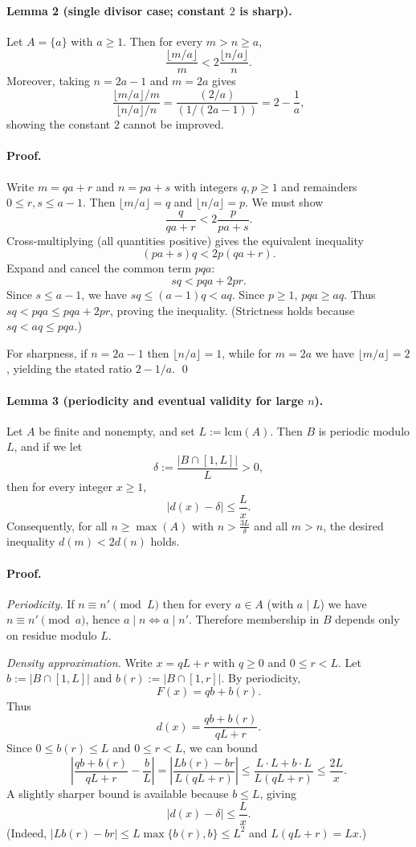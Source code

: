 \paragraph{Lemma 2 (single divisor case; constant $2$ is sharp).}
Let $A=\{a\}$ with $a\ge 1$. Then for every $m>n\ge a$,
\[\frac{\lfloor m/a\rfloor}{m} < 2\frac{\lfloor n/a\rfloor}{n}.
\]
Moreover, taking $n=2a-1$ and $m=2a$ gives
\[\frac{\lfloor m/a\rfloor/m}{\lfloor n/a\rfloor/n}=\frac{(2/a)}{(1/(2a-1))}=2-\frac{1}{a},\]
showing the constant $2$ cannot be improved.

\paragraph{Proof.}
Write $m=qa+r$ and $n=pa+s$ with integers $q,p\ge 1$ and remainders $0\le r,s\le a-1$.
Then $\lfloor m/a\rfloor=q$ and $\lfloor n/a\rfloor=p$.
We must show
\[\frac{q}{qa+r} < 2\frac{p}{pa+s}.
\]
Cross-multiplying (all quantities positive) gives the equivalent inequality
\[(pa+s)q < 2p(qa+r).
\]
Expand and cancel the common term $pqa$:
\[s q < pqa + 2pr.
\]
Since $s\le a-1$, we have $sq\le (a-1)q < aq$.
Since $p\ge 1$, $pqa \ge aq$.
Thus $sq < pqa\le pqa+2pr$, proving the inequality.
(Strictness holds because $sq<aq\le pqa$.)

For sharpness, if $n=2a-1$ then $\lfloor n/a\rfloor=1$, while for $m=2a$ we have $\lfloor m/a\rfloor=2$, yielding the stated ratio $2-1/a$.
\qed

\paragraph{Lemma 3 (periodicity and eventual validity for large $n$).}
Let $A$ be finite and nonempty, and set $L:=\mathrm{lcm}(A)$.
Then $B$ is periodic modulo $L$, and if we let
\[\delta:=\frac{|B\cap[1,L]|}{L}>0,
\]
then for every integer $x\ge 1$,
\[\bigl|d(x)-\delta\bigr|\le \frac{L}{x}.
\]
Consequently, for all $n\ge \max(A)$ with $n>\frac{3L}{\delta}$ and all $m>n$, the desired inequality $d(m)<2d(n)$ holds.

\paragraph{Proof.}
\emph{Periodicity.} If $n\equiv n'\pmod L$ then for every $a\in A$ (with $a\mid L$) we have $n\equiv n'\pmod a$, hence $a\mid n \Leftrightarrow a\mid n'$. Therefore membership in $B$ depends only on residue modulo $L$.

\emph{Density approximation.} Write $x=qL+r$ with $q\ge 0$ and $0\le r<L$.
Let $b:=|B\cap[1,L]|$ and $b(r):=|B\cap[1,r]|$.
By periodicity,
\[F(x)=qb + b(r).
\]
Thus
\[d(x)=\frac{qb+b(r)}{qL+r}.
\]
Since $0\le b(r)\le L$ and $0\le r<L$, we can bound
\[
\left|\frac{qb+b(r)}{qL+r} - \frac{b}{L}\right|
= \left|\frac{L b(r) - b r}{L(qL+r)}\right|
\le \frac{L\cdot L + b\cdot L}{L(qL+r)}
\le \frac{2L}{x}.
\]
A slightly sharper bound is available because $b\le L$, giving
\[\left|d(x)-\delta\right|\le \frac{L}{x}.
\]
(Indeed, $|L b(r) - b r|\le L\max\{b(r),b\}\le L^2$ and $L(qL+r)=Lx$.)

